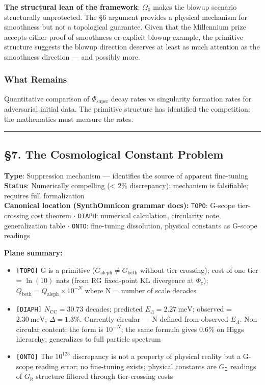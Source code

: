 \documentclass[12pt,a4paper]{article}
\newcommand{\pilcrow}{\S}
\begin{document}
\textbf{The structural lean of the framework}: $\Omega_0$ makes the blowup scenario structurally unprotected. The \pilcrow{}6 argument provides a physical mechanism for smoothness but not a topological guarantee. Given that the Millennium prize accepts either proof of smoothness or explicit blowup example, the primitive structure suggests the blowup direction deserves at least as much attention as the smoothness direction --- and possibly more.

\subsubsection{What Remains}

Quantitative comparison of $\Phi_{\text{super}}$ decay rates vs singularity formation rates for adversarial initial data. The primitive structure has identified the competition; the mathematics must measure the rates.

\begin{center}
\rule{0.5\textwidth}{0.4pt}
\end{center}

\subsection{\pilcrow{}7. The Cosmological Constant Problem}

\textbf{Type}: Suppression mechanism --- identifies the source of apparent fine-tuning   \\
\textbf{Status}: Numerically compelling (\textless{} 2\% discrepancy); mechanism is falsifiable; requires full formalization   \\
\textbf{Canonical location (SynthOmnicon grammar docs):} \texttt{TOPO}: G-scope tier-crossing cost theorem $\cdot$ \texttt{DIAPH}: numerical calculation, circularity note, generalization table $\cdot$ \texttt{ONTO}: fine-tuning dissolution, physical constants as G-scope readings

\textbf{Plane summary:}

\begin{itemize}
    \item \texttt{{[}TOPO{]}} G is a primitive ($G_{\text{aleph}} \neq G_{\text{beth}}$ without tier crossing); cost of one tier = $\ln(10)$ nats (from RG fixed-point KL divergence at $\Phi_c$); $Q_{\text{beth}} = Q_{\text{aleph}} \times 10^{-N}$ where N = number of scale decades
    \item \texttt{{[}DIAPH{]}} $N_{\text{CC}} = 30.73$ decades; predicted $E_{\Lambda} = 2.27\ \text{meV}$; observed = $2.30\ \text{meV}$; $\Delta = 1.3\%$. Currently circular --- N defined from observed $E_{\Lambda}$. Non-circular content: the form is $10^{-N}$; the same formula gives 0.6\% on Higgs hierarchy; generalizes to full particle spectrum
    \item \texttt{{[}ONTO{]}} The $10^{123}$ discrepancy is not a property of physical reality but a G-scope reading error; no fine-tuning exists; physical constants are $G_{\beth}$ readings of $G_{\aleph}$ structure filtered through tier-crossing costs
\end{itemize}
\end{document}
